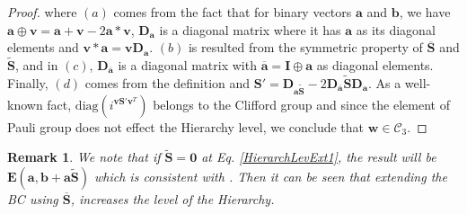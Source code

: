 \documentclass[lettersize,journal,onecolumn]{IEEEtran}
\newtheorem{remark}{Remark}
\begin{document}
\begin{proof}
where $(a)$ comes from the fact that for binary vectors $\mathbf{a}$ and $\mathbf{b}$, we have  $\mathbf{a} \oplus \mathbf{v} = \mathbf{a}+\mathbf{v}-2\mathbf{a}*\mathbf{v}$, $\mathbf{D}_{\mathbf{a}}$  is a diagonal matrix where it has $\mathbf{a}$ as its diagonal elements and $\mathbf{v}*\mathbf{a} = \mathbf{v}\mathbf{D}_{\mathbf{a}}$. $(b)$ is resulted from the symmetric property of $\overline{\mathbf{S}}$ and $\widetilde{\mathbf{S}}$, and in $(c)$, $\mathbf{D}_{\overline{\mathbf{a}}}$ is a diagonal matrix with $\overline{\mathbf{a}}=\mathbf{I}\oplus\mathbf{a}$ as diagonal elements. Finally, $(d)$ comes from the definition and  $\mathbf{S}'=\mathbf{D}_{\mathbf{a}\widetilde{\mathbf{S}} }-2\mathbf{D}_{\overline{\mathbf{a}}}\widetilde{\mathbf{S}}\mathbf{D}_\mathbf{a}$. As a well-known fact, $\text{diag}\left(i^{\mathbf{v S}' \mathbf{v}^T}\right)$ belongs to the Clifford group and since the element of Pauli group does not effect the Hierarchy level, we conclude that $\mathbf{w}\in\mathcal{C}_3$.
\end{proof}
\begin{remark}
We note that if $\widetilde{\mathbf{S}} = \mathbf{0}$ at Eq. \eqref{HierarchLevExt1}, the result will be $\mathbf{E}\left(\mathbf{a}, \mathbf{b+a}\widetilde{\mathbf{S}}\right)$ which is consistent with \cite{Renagaswamy20LogicalCliff}. Then it can be seen that extending the BC using $\overline{\mathbf{S}}$, increases the level of the Hierarchy.
\end{remark}
\end{document}
